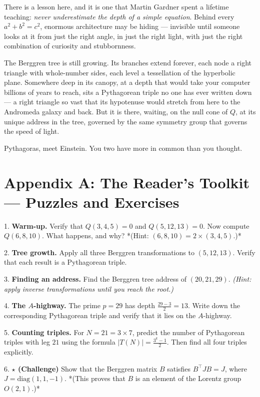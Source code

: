 \documentclass[11pt,openright,twoside]{book}
\theoremstyle{definition}
\begin{document}
There is a lesson here, and it is one that Martin Gardner spent a lifetime teaching: \textit{never underestimate the depth of a simple equation}. Behind every $a^2 + b^2 = c^2$, enormous architecture may be hiding --- invisible until someone looks at it from just the right angle, in just the right light, with just the right combination of curiosity and stubbornness.

The Berggren tree is still growing. Its branches extend forever, each node a right triangle with whole-number sides, each level a tessellation of the hyperbolic plane. Somewhere deep in its canopy, at a depth that would take your computer billions of years to reach, sits a Pythagorean triple no one has ever written down --- a right triangle so vast that its hypotenuse would stretch from here to the Andromeda galaxy and back. But it is there, waiting, on the null cone of $Q$, at its unique address in the tree, governed by the same symmetry group that governs the speed of light.

Pythagoras, meet Einstein. You two have more in common than you thought.


\bigskip


\section{Appendix A: The Reader's Toolkit — Puzzles and Exercises}

1. \textbf{Warm-up.} Verify that $Q(3, 4, 5) = 0$ and $Q(5, 12, 13) = 0$. Now compute $Q(6, 8, 10)$. What happens, and why? *(Hint: $(6, 8, 10) = 2 \times (3, 4, 5)$.)*

2. \textbf{Tree growth.} Apply all three Berggren transformations to $(5, 12, 13)$. Verify that each result is a Pythagorean triple.

3. \textbf{Finding an address.} Find the Berggren tree address of $(20, 21, 29)$. \textit{(Hint: apply inverse transformations until you reach the root.)}

4. \textbf{The $A$-highway.} The prime $p = 29$ has depth $\frac{29 - 3}{2} = 13$. Write down the corresponding Pythagorean triple and verify that it lies on the $A$-highway.

5. \textbf{Counting triples.} For $N = 21 = 3 \times 7$, predict the number of Pythagorean triples with leg $21$ using the formula $|T(N)| = \frac{3^k - 1}{2}$. Then find all four triples explicitly.

6. \textbf{{$\star$} (Challenge)} Show that the Berggren matrix $B$ satisfies $B^\top J B = J$, where $J = \text{diag}(1, 1, -1)$. *(This proves that $B$ is an element of the Lorentz group $O(2,1)$.)*
\end{document}
